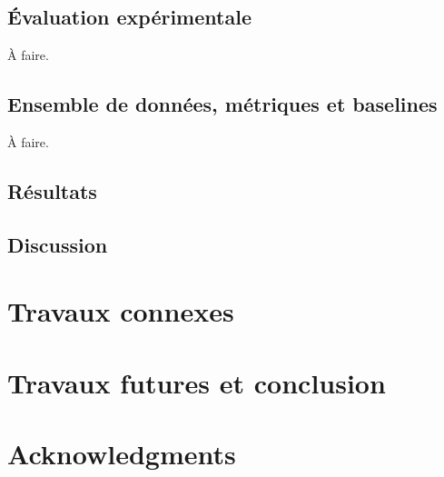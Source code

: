 \documentclass[11pt,a4paper, french]{article}
\begin{document}
\subsection{Évaluation expérimentale }

À faire.

\subsection{Ensemble de données, métriques et baselines }

À faire. 



\subsection{Résultats}


\subsection{Discussion}


\section{Travaux connexes}



\section{Travaux futures et conclusion }

\section*{Acknowledgments}
 




\appendix
\end{document}
